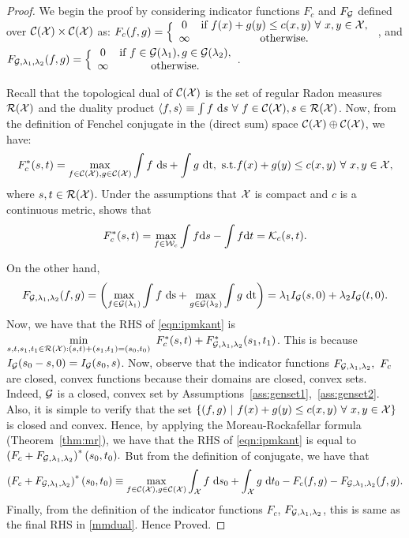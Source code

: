 \begin{proof}
We begin the proof by considering indicator functions $F_c$ and $F_{\mathcal{G}}$ defined over $\mathcal{C}(\mathcal{X})\times\mathcal{C}(\mathcal{X})$ as: \newline
$F_c(f,g)=\Big\{\begin{array}{cc}
    0 & \textup{if } f(x)+g(y)\le c(x,y)\ \forall\ x,y\in\mathcal{X},\\
    \infty & \textup{otherwise}.
\end{array}$
, and 
\newline
$F_{\mathcal{G}, \lambda_1, \lambda_2}(f,g)=\Big\{\begin{array}{cc}
    0 & \textup{if } f\in\mathcal{G}(\lambda_1),g\in\mathcal{G}(\lambda_2),\\
    \infty & \textup{otherwise.}
\end{array}$.

Recall that the topological dual of $\mathcal{C}(\mathcal{X})$ is the set of regular Radon measures $\mathcal{R}(\mathcal{X})$ and the duality product $\langle f,s\rangle\equiv\int f\  \textup{d}s\ \forall\ f\in\mathcal{C}(\mathcal{X}), s\in\mathcal{R}(\mathcal{X})$. Now, from the definition of Fenchel conjugate in the (direct sum) space $\mathcal{C}(\mathcal{X})\oplus\mathcal{C}(\mathcal{X})$, we have: $$F_c^*(s,t)=\max\limits_{f\in\mathcal{C}(\mathcal{X}),g\in\mathcal{C}(\mathcal{X})} \int f\ \textup{ds}+\int g\ \textup{dt}, \ \textup{s.t.} f(x)+g(y)\le c(x,y)\ \forall\ x,y\in\mathcal{X},$$ where $s,t\in\mathcal{R}(\mathcal{X})$. Under the assumptions that $\mathcal{X}$ is compact and $c$ is a continuous metric, \citet[Proposition~6.1]{peyre2019computational} shows that $$F_c^*(s,t)=\max\limits_{f\in\mathcal{W}_c}\int f\textup{d} s - \int f\textup{d} t = \mathcal{K}_c(s,t).$$ 

\noindent On the other hand, $$F_{\calG, \lambda_1, \lambda_2}(f,g)=\left(\max\limits_{f\in\calG(\lambda_1)} \int f\ \textup{ds} + \max\limits_{g\in\calG(\lambda_2)} \int g\ \textup{dt}\right)=\lambda_1 I_\calG(s,0)+\lambda_2 I_\calG(t,0).$$ Now, we have that the RHS of \ref{eqn:ipmkant} is $\min\limits_{s,t,s_1,t_1\in\calR(\calX):(s,t)+(s_1,t_1)=(s_0,t_0)}\ F^*_c(s,t)+F^*_{\calG, \lambda_1, \lambda_2}(s_1,t_1)$. This is because $ I_{\mathcal{G}}(s_0-s,0)= I_{\mathcal{G}}(s_0,s)$. Now, observe that the indicator functions $F_{\mathcal{G}, \lambda_1, \lambda_2}, \ F_c$ are closed, convex functions because their domains are closed, convex sets. Indeed, $\mathcal{G}$ is a closed, convex set by Assumptions~\ref{ass:genset1},\ \ref{ass:genset2}. Also, it is simple to verify that the set $\left\{(f,g)\ |\ f(x)+g(y)\le c(x,y)\ \forall\ x,y\in\calX\right\}$ is closed and convex. Hence, by applying the Moreau-Rockafellar formula (Theorem~\ref{thm:mr}), we have that the RHS of \ref{eqn:ipmkant} is equal to $\left(F_c + F_{\mathcal{G}, \lambda_1, \lambda_2}\right)^*(s_0, t_0).$ But from the definition of conjugate, we have that $$\left(F_c + F_{\calG, \lambda_1, \lambda_2}\right)^*(s_0, t_0)\equiv\max\limits_{f\in\calC(\calX),g\in\calC(\calX)}\int_\calX f\ \textup{d}s_0+\int_\calX g\ \textup{d}t_0 - F_c(f,g) -F_{\calG, \lambda_1, \lambda_2}(f,g).$$ Finally, from the definition of the indicator functions $F_c$, $F_{\mathcal{G}, \lambda_1, \lambda_2}$, this is same as the final RHS in \ref{mmdual}. Hence Proved.
\end{proof}

